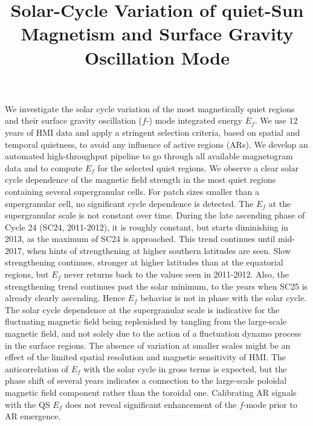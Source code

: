 \documentclass{aa}
\begin{document}
\title{Solar-Cycle Variation of quiet-Sun Magnetism and Surface Gravity Oscillation Mode}



{We investigate the solar cycle variation of the most magnetically quiet regions and
their surface gravity oscillation ($f$-) mode integrated 
energy $E_f$.
}
{We use 12 years of HMI data and apply a stringent selection criteria, based on
spatial and temporal quietness, to avoid any influence of active regions (ARs).
We develop an automated high-throughput pipeline to go through all available magnetogram data
and to compute 
$E_f$
for the selected quiet regions.}
{We observe a clear solar cycle dependence of the magnetic field strength in the most
quiet regions containing several supergranular cells. For patch sizes smaller than a supergranular
cell, no significant cycle dependence is detected. The $E_f$ at the supergranular scale 
is not constant over time.
During the late ascending phase of Cycle 24 (SC24, 2011-2012), it is roughly constant, but starts diminishing in 2013, as the maximum of SC24 is approached. This trend continues
until 
mid-2017,
when
hints of strengthening at higher southern latitudes
are seen.
Slow strengthening continues, stronger at higher latitudes than at the equatorial regions, but $E_f$ never returns back to the values seen in 2011-2012. Also, the strengthening trend continues past the solar minimum, to the years when SC25 is already clearly ascending. Hence $E_f$ behavior is not in phase with the solar cycle.
}
{The solar cycle dependence at the supergranular scale is indicative for the fluctuating magnetic
field being replenished by tangling from the large-scale magnetic field, and not solely due to
the action of a fluctuation dynamo process in the surface regions. 
The absence of variation at smaller scales might be an effect of the
limited spatial resolution and magnetic sensitivity of HMI.
The 
anticorrelation of $E_f$ with the solar cycle in gross terms is expected, but the phase shift of several years indicates a connection to the large-scale poloidal magnetic field component rather than the toroidal one. Calibrating AR signals with the QS $E_f$ does not reveal significant enhancement of the $f$-mode prior to AR emergence.
}

\end{document}
